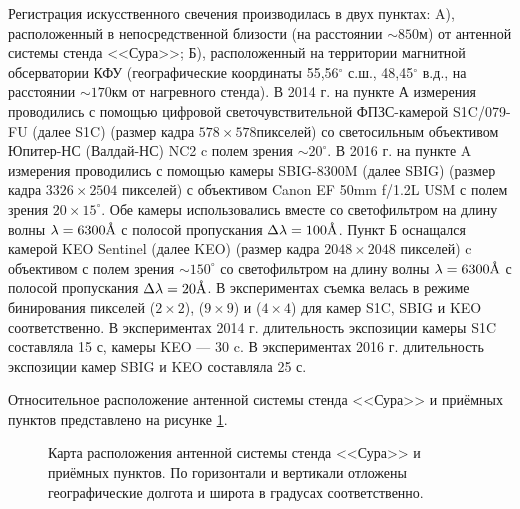\documentclass[12pt,a4paper]{article}
\newcommand{\angstrom}{\textup{\AA}}
\begin{document}
Регистрация искусственного свечения производилась в двух пунктах: A), расположенный в непосредственной близости (на расстоянии $\sim850$м) от антенной системы стенда <<Сура>>; Б), расположенный на территории магнитной обсерватории КФУ (географические координаты 55,56$^{\circ}$ с.ш., 48,45$^{\circ}$ в.д., на расстоянии $\sim170$км от нагревного стенда). В 2014 г. на пункте А измерения проводились с помощью цифровой светочувствительной ФПЗС-камерой S1C/079-FU (далее S1C) \cite{S1C_specs} (размер кадра $578\times578$пикселей) со светосильным объективом Юпитер-НС (Валдай-НС) NC2 \cite{NC2_specs} c полем зрения $\sim20^{\circ}$. В 2016 г. на пункте A измерения проводились с помощью камеры SBIG-8300M (далее SBIG) \cite{SBIG_specs} (размер кадра $3326\times2504$ пикселей) с объективом Canon EF 50mm f/1.2L USM с полем зрения $20\times15^{\circ}$. Обе камеры использовались вместе со светофильтром на длину волны $\lambda=6300\angstrom$ с полосой пропускания $\Delta \lambda = 100\angstrom$. Пункт Б оснащался камерой KEO Sentinel (далее KEO) \cite{KEO_specs} (размер кадра $2048\times2048$ пикселей) c объективом с полем зрения $\sim150^{\circ}$ со светофильтром на длину волны $\lambda=6300\angstrom$ с полосой пропускания $\Delta \lambda = 20\angstrom$. В экспериментах съемка велась в режиме бинирования пикселей ($2\times2$), ($9\times9$) и ($4\times4$) для камер S1C, SBIG и KEO соответственно. В экспериментах 2014 г. длительность экспозиции камеры S1C составляла 15 с, камеры KEO --- 30 c. В экспериментах 2016 г. длительность экспозиции камер SBIG и KEO составляла 25 с.


Относительное расположение антенной системы стенда <<Сура>> и приёмных пунктов представлено на рисунке \ref{fig:fig1}.



\begin{figure}[h]
	\caption{Карта расположения антенной системы стенда <<Сура>> и приёмных пунктов. По горизонтали и вертикали отложены географические долгота и широта в градусах соответственно.}
	\label{fig:fig1}
\end{figure}
\end{document}

